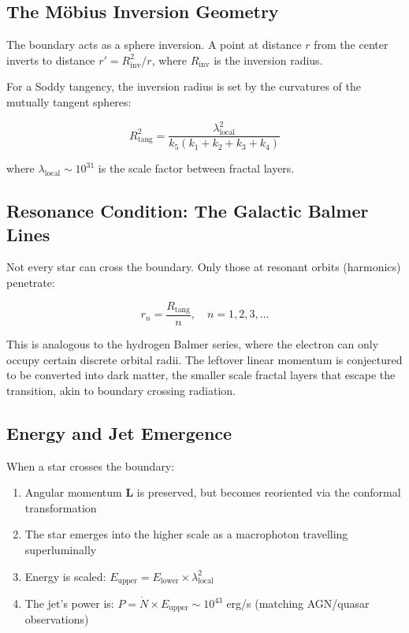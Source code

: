 \documentclass[11pt,a4paper]{article}
\begin{document}
\subsection{The Möbius Inversion Geometry}

The boundary acts as a sphere inversion. A point at distance $r$ from the center inverts to distance $r' = R_{\text{inv}}^2 / r$, where $R_{\text{inv}}$ is the inversion radius.

For a Soddy tangency, the inversion radius is set by the curvatures of the mutually tangent spheres:

\[
R_{\text{tang}}^2 = \frac{\lambda_{\text{local}}^2}{k_5(k_1 + k_2 + k_3 + k_4)}
\]

where $\lambda_{\text{local}} \sim 10^{31}$ is the scale factor between fractal layers.

\subsection{Resonance Condition: The Galactic Balmer Lines}

Not every star can cross the boundary. Only those at resonant orbits (harmonics) penetrate:

\[
r_n = \frac{R_{\text{tang}}}{n}, \quad n = 1, 2, 3, \ldots
\]

This is analogous to the hydrogen Balmer series, where the electron can only occupy certain discrete orbital radii. The leftover linear momentum is conjectured to be converted into dark matter, the smaller scale fractal layers that escape the transition, akin to boundary crossing radiation.

\subsection{Energy and Jet Emergence}

When a star crosses the boundary:
\begin{enumerate}
\item Angular momentum $\mathbf{L}$ is preserved, but becomes reoriented via the conformal transformation
\item The star emerges into the higher scale as a macrophoton travelling superluminally
\item Energy is scaled: $E_{\text{upper}} = E_{\text{lower}} \times \lambda_{\text{local}}^2$
\item The jet's power is: $P = \dot{N} \times E_{\text{upper}} \sim 10^{43}$ erg/s (matching AGN/quasar observations)
\end{enumerate}
\end{document}
